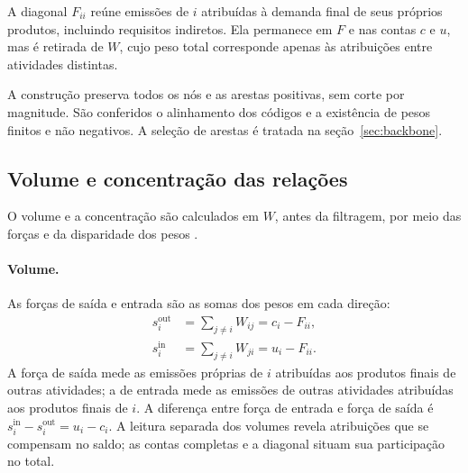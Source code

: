 \documentclass[12pt]{article}
\begin{document}
A diagonal $F_{ii}$ reúne emissões de $i$ atribuídas à demanda final de seus próprios produtos, incluindo requisitos indiretos. Ela permanece em $F$ e nas contas $c$ e $u$, mas é retirada de $W$, cujo peso total corresponde apenas às atribuições entre atividades distintas.

A construção preserva todos os nós e as arestas positivas, sem corte por magnitude. São conferidos o alinhamento dos códigos e a existência de pesos finitos e não negativos. A seleção de arestas é tratada na seção~\ref{sec:backbone}.

\subsection{Volume e concentração das relações}
\label{sec:volume-concentracao}

O volume e a concentração são calculados em $W$, antes da filtragem, por meio das forças e da disparidade dos pesos \parencite{huang2019,serrano2009}.

\paragraph{Volume.}
As forças de saída e entrada são as somas dos pesos em cada direção:
\begin{equation}
\begin{aligned}
s_i^{\mathrm{out}}&=\sum_{j\ne i}W_{ij}=c_i-F_{ii},\\
s_i^{\mathrm{in}}&=\sum_{j\ne i}W_{ji}=u_i-F_{ii}.
\end{aligned}
\label{eq:forcas-externas}
\end{equation}
A força de saída mede as emissões próprias de $i$ atribuídas aos produtos finais de outras atividades; a de entrada mede as emissões de outras atividades atribuídas aos produtos finais de $i$. A diferença entre força de entrada e força de saída é $s_i^{\mathrm{in}}-s_i^{\mathrm{out}}=u_i-c_i$. A leitura separada dos volumes revela atribuições que se compensam no saldo; as contas completas e a diagonal situam sua participação no total.
\end{document}
